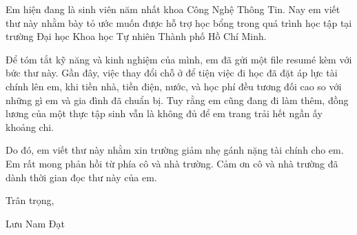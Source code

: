 \documentclass{article}
\begin{document}
 

Em hiện đang là sinh viên năm nhất khoa Công Nghệ Thông Tin. Nay em viết thư này nhằm bày tỏ ước muốn được hỗ trợ học bổng trong quá trình học tập tại trường Đại học Khoa học Tự nhiên Thành phố Hồ Chí Minh.

Để tóm tắt kỹ năng và kinh nghiệm của mình, em đã gửi một file resumé kèm với bức thư này. Gần đây, việc thay đổi chỗ ở để tiện việc đi học đã đặt áp lực tài chính lên em, khi tiền nhà, tiền điện, nước, và học phí đều tương đối cao so với những gì em và gia đình đã chuẩn bị. Tuy rằng em cũng đang đi làm thêm, đồng lương của một thực tập sinh vẫn là không đủ để em trang trải hết ngần ấy khoảng chi.

Do đó, em viết thư này nhằm xin trường giảm nhẹ gánh nặng tài chính cho em. Em rất mong phản hồi từ phía cô và nhà trường. Cảm ơn cô và nhà trường đã dành thời gian đọc thư này của em.

\bigskip %

Trân trọng,

\vspace{50pt} %

Lưu Nam Đạt
\end{document}
